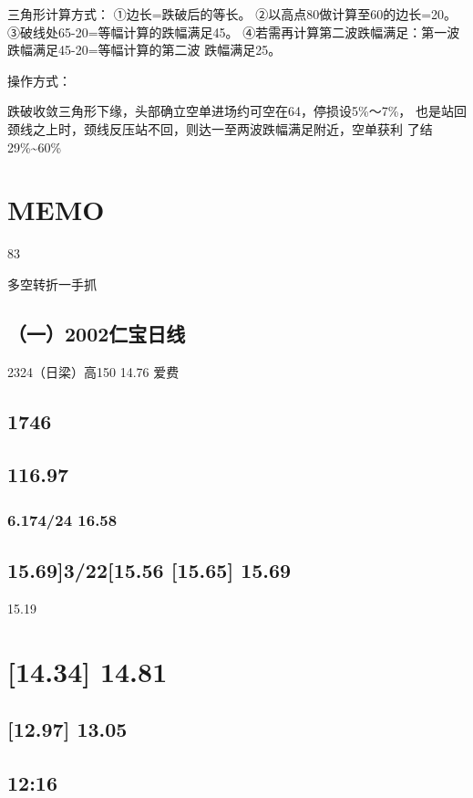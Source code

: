 \documentclass{article}
\begin{document}
三角形计算方式： ①边长=跌破后的等长。 ②以高点80做计算至60的边长=20。 ③破线处65-20=等幅计算的跌幅满足45。 ④若需再计算第二波跌幅满足：第一波跌幅满足45-20=等幅计算的第二波 跌幅满足25。

操作方式：

跌破收敛三角形下缘，头部确立空单进场约可空在64，停损设5\%～7\%， 也是站回颈线之上时，颈线反压站不回，则达一至两波跌幅满足附近，空单获利 了结29\%\textasciitilde{}60\%

\section{MEMO}

83

\clearpage

多空转折一手抓

\subsection{（一）2002仁宝日线}

2324（日梁）高150 14.76 爱费

\subsection{1746}

\subsection{116.97}

\subsubsection{6.174/24 16.58}

\subsection{15.69]3/22[15.56 [15.65] 15.69}

15.19

\section{[14.34] 14.81}

\subsection{[12.97] 13.05}

\subsection{12:16}
\end{document}

